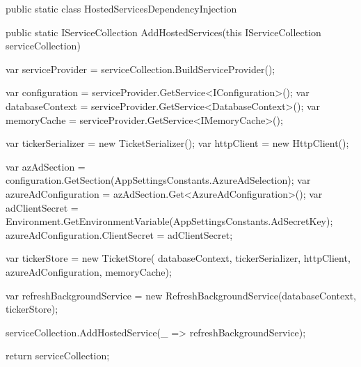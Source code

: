 \begin{spverbatim}
    public static class HostedServicesDependencyInjection
        {
        public static IServiceCollection AddHostedServices(this IServiceCollection serviceCollection)
            {
            var serviceProvider = serviceCollection.BuildServiceProvider();

            var configuration = serviceProvider.GetService<IConfiguration>();
            var databaseContext = serviceProvider.GetService<DatabaseContext>();
            var memoryCache = serviceProvider.GetService<IMemoryCache>();

            var tickerSerializer = new TicketSerializer();
            var httpClient = new HttpClient();

            var azAdSection = configuration.GetSection(AppSettingsConstants.AzureAdSelection);
            var azureAdConfiguration = azAdSection.Get<AzureAdConfiguration>();
            var adClientSecret = Environment.GetEnvironmentVariable(AppSettingsConstants.AdSecretKey);
            azureAdConfiguration.ClientSecret = adClientSecret;

            var tickerStore = new TicketStore(
            databaseContext,
            tickerSerializer,
            httpClient,
            azureAdConfiguration,
            memoryCache);

            var refreshBackgroundService = new RefreshBackgroundService(databaseContext, tickerStore);

            serviceCollection.AddHostedService(_ => refreshBackgroundService);

            return serviceCollection;
        }
    }
\end{spverbatim}